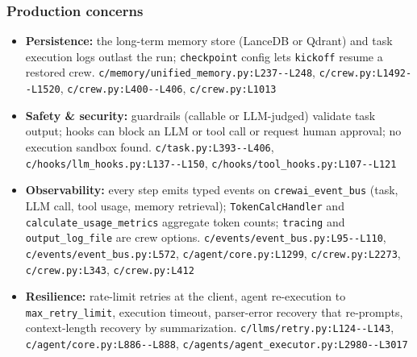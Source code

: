 \subsubsection*{Production concerns}
\begin{itemize}
\item \textbf{Persistence:} the long-term memory store (LanceDB or Qdrant) and task execution logs outlast the run; \texttt{checkpoint} config lets \texttt{kickoff} resume a restored crew. \texttt{c/\allowbreak{}memory/\allowbreak{}unified\_\allowbreak{}memory.\allowbreak{}py:\allowbreak{}L237-\allowbreak{}-\allowbreak{}L248}, \texttt{c/\allowbreak{}crew.\allowbreak{}py:\allowbreak{}L1492-\allowbreak{}-\allowbreak{}L1520}, \texttt{c/\allowbreak{}crew.\allowbreak{}py:\allowbreak{}L400-\allowbreak{}-\allowbreak{}L406}, \texttt{c/\allowbreak{}crew.\allowbreak{}py:\allowbreak{}L1013}
\item \textbf{Safety \& security:} guardrails (callable or LLM-judged) validate task output; hooks can block an LLM or tool call or request human approval; no execution sandbox found. \texttt{c/\allowbreak{}task.\allowbreak{}py:\allowbreak{}L393-\allowbreak{}-\allowbreak{}L406}, \texttt{c/\allowbreak{}hooks/\allowbreak{}llm\_\allowbreak{}hooks.\allowbreak{}py:\allowbreak{}L137-\allowbreak{}-\allowbreak{}L150}, \texttt{c/\allowbreak{}hooks/\allowbreak{}tool\_\allowbreak{}hooks.\allowbreak{}py:\allowbreak{}L107-\allowbreak{}-\allowbreak{}L121}
\item \textbf{Observability:} every step emits typed events on \texttt{crewai\_\allowbreak{}event\_\allowbreak{}bus} (task, LLM call, tool usage, memory retrieval); \texttt{TokenCalcHandler} and \texttt{calculate\_\allowbreak{}usage\_\allowbreak{}metrics} aggregate token counts; \texttt{tracing} and \texttt{output\_\allowbreak{}log\_\allowbreak{}file} are crew options. \texttt{c/\allowbreak{}events/\allowbreak{}event\_\allowbreak{}bus.\allowbreak{}py:\allowbreak{}L95-\allowbreak{}-\allowbreak{}L110}, \texttt{c/\allowbreak{}events/\allowbreak{}event\_\allowbreak{}bus.\allowbreak{}py:\allowbreak{}L572}, \texttt{c/\allowbreak{}agent/\allowbreak{}core.\allowbreak{}py:\allowbreak{}L1299}, \texttt{c/\allowbreak{}crew.\allowbreak{}py:\allowbreak{}L2273}, \texttt{c/\allowbreak{}crew.\allowbreak{}py:\allowbreak{}L343}, \texttt{c/\allowbreak{}crew.\allowbreak{}py:\allowbreak{}L412}
\item \textbf{Resilience:} rate-limit retries at the client, agent re-execution to \texttt{max\_\allowbreak{}retry\_\allowbreak{}limit}, execution timeout, parser-error recovery that re-prompts, context-length recovery by summarization. \texttt{c/\allowbreak{}llms/\allowbreak{}retry.\allowbreak{}py:\allowbreak{}L124-\allowbreak{}-\allowbreak{}L143}, \texttt{c/\allowbreak{}agent/\allowbreak{}core.\allowbreak{}py:\allowbreak{}L886-\allowbreak{}-\allowbreak{}L888}, \texttt{c/\allowbreak{}agents/\allowbreak{}agent\_\allowbreak{}executor.\allowbreak{}py:\allowbreak{}L2980-\allowbreak{}-\allowbreak{}L3017}

\end{itemize}
